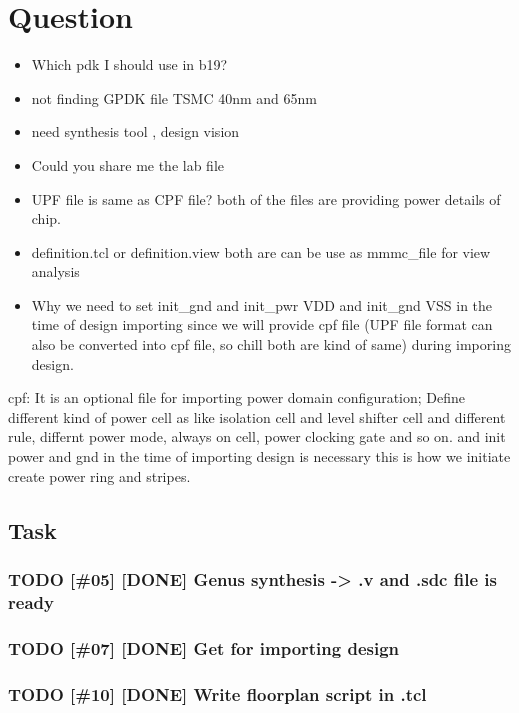 \documentclass[a4paper]{article}
\begin{document}
\section{Question}
\label{sec:org1d49254}
\begin{itemize}
\item Which pdk I should use in b19?
\item not finding GPDK file TSMC 40nm and 65nm
\item need synthesis tool , design vision
\item Could you share me the lab file
\item UPF file is same as CPF file? both of the files are providing power details of chip.
\item definition.tcl or definition.view both are can be use as mmmc\_file for view analysis
\item Why we need to set init\_gnd and init\_pwr VDD and init\_gnd VSS in the time of design importing since we will provide cpf file (UPF file format can also be converted into cpf file, so chill both are kind of same) during imporing design.
\end{itemize}
cpf: It is an optional file for importing power domain configuration; Define different kind of power cell as like isolation cell and level shifter cell
and different rule, differnt power mode, always on cell, power clocking gate and so on.
and init power and gnd in the time of importing design is necessary this is how we initiate create power ring and stripes.


\subsection{Task}
\label{sec:org0936590}

\subsubsection{{\bfseries\sffamily TODO} [\#05] [DONE] Genus synthesis -> .v and .sdc file is ready}
\label{sec:orgfe6a51d}
\subsubsection{{\bfseries\sffamily TODO} [\#07] [DONE] Get for importing design}
\label{sec:org4979460}
\subsubsection{{\bfseries\sffamily TODO} [\#10] [DONE] Write floorplan script  in .tcl}
\label{sec:org1459713}
\end{document}
